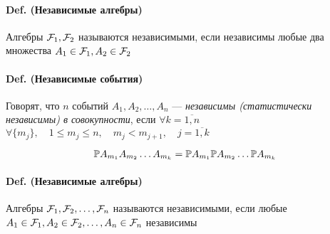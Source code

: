 \paragraph{Def. (Независимые
алгебры)}\label{def.-ux43dux435ux437ux430ux432ux438ux441ux438ux43cux44bux435-ux430ux43bux433ux435ux431ux440ux44b}

Алгебры \(\mathcal F_1, \mathcal F_2\) называются независимыми, если
независимы любые два множества
\(A_1\in\mathcal F_1, A_2\in\mathcal F_2\)

\paragraph{Def. (Независимые
события)}\label{def.-ux43dux435ux437ux430ux432ux438ux441ux438ux43cux44bux435-ux441ux43eux431ux44bux442ux438ux44f-1}

Говорят, что \(n\) событий \(A_1, A_2, \ldots, A_n\) ---
\emph{независимы (статистически независимы) в совокупности}, если
\(\forall {k=\overline{1,n}}\)
\(\forall \{m_j\},\quad {1\leq m_j\leq n},\quad {m_{j}<m_{j+1}},\quad j=\overline{1,k}\)

\[\mathbb P A_{m_1} A_{m_2} \ldots A_{m_k} = \mathbb P A_{m_1} \mathbb P A_{m_2} \ldots \mathbb P A_{m_k}\]

\paragraph{Def. (Независимые
алгебры)}\label{def.-ux43dux435ux437ux430ux432ux438ux441ux438ux43cux44bux435-ux430ux43bux433ux435ux431ux440ux44b-1}

Алгебры \(\mathcal F_1, \mathcal F_2, \ldots, \mathcal F_n\)
называются независимыми, если любые
\(A_1\in\mathcal F_1, A_2\in\mathcal F_2, \ldots, A_n\in\mathcal F_n\)
независимы

